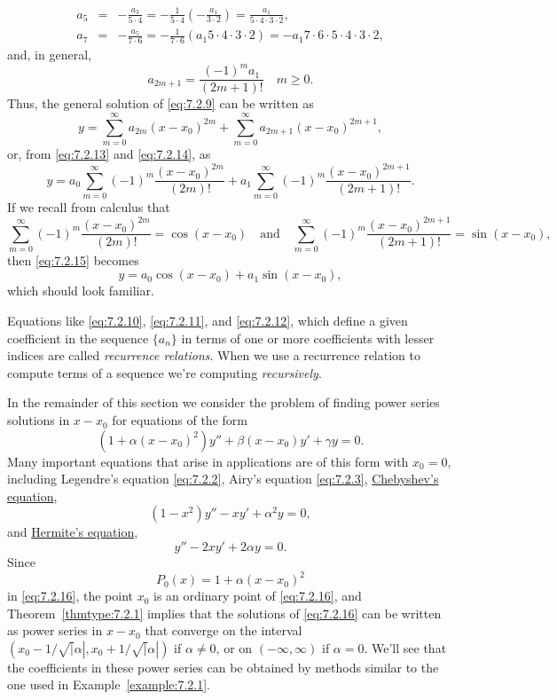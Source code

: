 \documentclass{ximera}
\begin{document}
\begin{example}
\begin{explanation}
\begin{eqnarray*}
a_5&=&-\frac{a_3}{5\cdot4}=-\frac{1}{5\cdot4}
 \left(-\frac{a_1}{3\cdot2}\right)=
 \frac{a_1}{5\cdot4\cdot3\cdot2}, \\
a_7&=&-\frac{a_5}{7\cdot6}=-\frac{1}{7\cdot6}
 \left({a_1}{5\cdot4\cdot3\cdot2}\right)
=-{a_1}{7\cdot6\cdot5\cdot4\cdot
 3\cdot2},
\end{eqnarray*}
and, in general,
\begin{equation}\label{eq:7.2.14}
a_{2m+1}=\frac{(-1)^ma_1}{(2m+1)!}\quad m\geq0.
\end{equation}
Thus, the general solution of \eqref{eq:7.2.9} can be written as
$$
y=\sum_{m=0}^\infty a_{2m}(x-x_0)^{2m}+\sum_{m=0}^\infty a_{2m+1}(x-x_0)^{2m+1},
$$
or, from \eqref{eq:7.2.13} and \eqref{eq:7.2.14}, as
\begin{equation}\label{eq:7.2.15}
y=a_0\sum_{m=0}^\infty(-1)^m\frac{(x-x_0)^{2m}}{(2m)!}
+a_1\sum_{m=0}^\infty(-1)^m\frac{(x-x_0)^{2m+1}}{(2m+1)!}.
\end{equation}
If we recall from calculus that
$$
\sum_{m=0}^\infty(-1)^m\frac{(x-x_0)^{2m}}{(2m)!}=\cos(x-x_0)
\quad\mbox{and}\quad
\sum_{m=0}^\infty(-1)^m\frac{(x-x_0)^{2m+1}}{(2m+1)!}=\sin(x-x_0),
$$
then \eqref{eq:7.2.15} becomes
$$
y=a_0\cos(x-x_0)+a_1\sin(x-x_0),
$$
which should look familiar.
\end{explanation}
\end{example}

Equations like \eqref{eq:7.2.10}, \eqref{eq:7.2.11}, and \eqref{eq:7.2.12}, which
define a given coefficient in the sequence $\{a_n\}$ in terms of one
or more coefficients with lesser indices are called \textit{recurrence relations}. When we use a recurrence relation to compute terms of a sequence we're computing \textit{recursively}.

In  the remainder of this  section we  consider the problem of
finding power series solutions in $x-x_0$  for equations of the form
\begin{equation}\label{eq:7.2.16}
\left(1+\alpha(x-x_0)^2\right)y''+\beta(x-x_0) y'+\gamma y=0.
\end{equation}
Many important equations that arise in applications are of this
form with $x_0=0$, including  Legendre's equation \eqref{eq:7.2.2},
Airy's equation \eqref{eq:7.2.3},
\href{http://www-history.mcs.st-and.ac.uk/Mathematicians/Chebyshev.html}{Chebyshev's  equation},
$$
(1-x^2)y''-xy'+\alpha^2 y=0,
$$
and
\href{http://www-history.mcs.st-and.ac.uk/Mathematicians/Hermite.html}{Hermite's equation},
$$
y''-2xy'+2\alpha y=0.
$$
Since
$$
P_0(x)=1+\alpha(x-x_0)^2
$$
in \eqref{eq:7.2.16}, the point $x_0$ is an ordinary point of
\eqref{eq:7.2.16}, and Theorem~\ref{thmtype:7.2.1} implies that the solutions
of \eqref{eq:7.2.16} can be written as power series in $x-x_0$ that
converge on the interval $(x_0-1/\sqrt|\alpha|,x_0+1/\sqrt|\alpha|)$
if $\alpha\neq0$, or on $(-\infty,\infty)$ if $\alpha=0$. We'll see
that the coefficients in these power series can be obtained by methods
similar to the one used in Example~\ref{example:7.2.1}.
\end{document}
